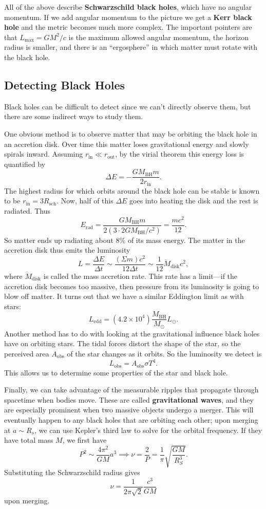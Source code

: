 \documentclass[../a062main.tex]{subfiles}
\begin{document}
All of the above describe \textbf{Schwarzschild black holes}, which have no angular momentum.
If we add angular momentum to the picture we get a \textbf{Kerr black hole} and the metric becomes much more complex.
The important pointers are that $L_\textrm{max} = GM^2 / c$ is the maximum allowed angular momentum, the horizon radius is smaller, and there is an ``ergosphere'' in which matter must rotate with the black hole.

\subsection*{Detecting Black Holes}
Black holes can be difficult to detect since we can't directly observe them, but there are some indirect ways to study them.

One obvious method is to observe matter that may be orbiting the black hole in an accretion disk.
Over time this matter loses gravitational energy and slowly spirals inward.
Assuming $r_\textrm{in} \ll r_\textrm{out}$, by the virial theorem this energy loss is quantified by
\[ \Delta E = -\frac{GM_\textrm{BH}m}{2r_\textrm{in}}. \]
The highest radius for which orbits around the black hole can be stable is known to be $r_\textrm{in} = 3R_\textrm{sch}$.
Now, half of this $\Delta E$ goes into heating the disk and the rest is radiated.
Thus
\[ E_\textrm{rad} = \frac{GM_\textrm{BH}m}{2 (3 \cdot 2GM_\textrm{BH} / c^2)} = \frac{mc^2}{12}. \]
So matter ends up radiating about 8\% of its mass energy.
The matter in the accretion disk thus emits the luminosity
\[ L = \frac{\Delta E}{\Delta t} \sim \frac{(\Sigma m) c^2}{12 \Delta t} \sim \frac{1}{12} \dot M_\textrm{disk} c^2, \]
where $\dot M_\textrm{disk}$ is called the mass accretion rate.
This rate has a limit---if the accretion disk becomes too massive, then pressure from its luminosity is going to blow off matter.
It turns out that we have a similar Eddington limit as with stars:
\[ L_\textrm{edd} = (4.2 \times 10^{4}) \frac{M_\textrm{BH}}{M_\odot} L_\odot. \]
Another method has to do with looking at the gravitational influence black holes have on orbiting stars.
The tidal forces distort the shape of the star, so the perceived area $A_\textrm{obs}$ of the star changes as it orbits.
So the luminosity we detect is
\[ L_\textrm{obs} = A_\textrm{obs} \sigma T^{4}. \]
This allows us to determine some properties of the star and black hole.

Finally, we can take advantage of the measurable ripples that propagate through spacetime when bodies move.
These are called \textbf{gravitational waves}, and they are especially prominent when two massive objects undergo a merger.
This will eventually happen to any black holes that are orbiting each other; upon merging at $a \sim R_s$, we can use Kepler's third law to solve for the orbital frequency.
If they have total mass $M$, we first have
\[ P^2 \sim \frac{4\pi^2}{GM} a^3 \implies \nu = \frac{2}{P} = \frac{1}{\pi} \sqrt{\frac{GM}{R_S^3}}. \]
Substituting the Schwarzschild radius gives
\[ \nu = \frac{1}{2\pi \sqrt{2}} \frac{c^3}{GM} \]
upon merging.

\end{document}
